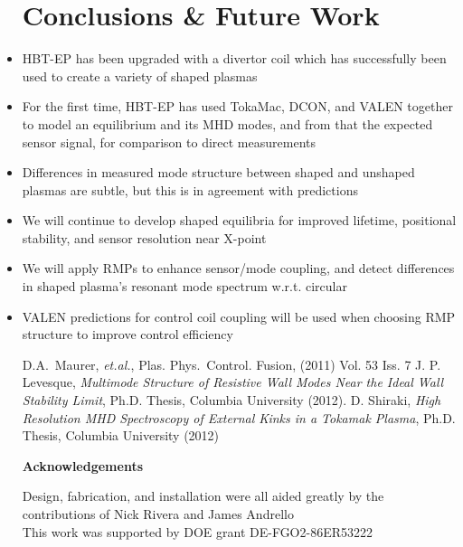 \documentclass{article}
\begin{document}
\begin{multicols}{5}
\begin{itemize}
\section{Conclusions \& Future Work}
\item HBT-EP has been upgraded with a divertor coil which has successfully been used to create a variety of shaped plasmas
\item For the first time, HBT-EP has used TokaMac, DCON, and VALEN together to model an equilibrium and its MHD modes, and from that the expected sensor signal, for comparison to direct measurements
\item Differences in measured mode structure between shaped and unshaped plasmas are subtle, but this is in agreement with predictions
\item We will continue to develop shaped equilibria for improved lifetime, positional stability, and sensor resolution near X-point
\item We will apply RMPs to enhance sensor/mode coupling, and detect differences in shaped plasma's resonant mode spectrum w.r.t. circular
\item VALEN predictions for control coil coupling will be used when choosing RMP structure to improve control efficiency
\begin{thebibliography}{9}%
\large
{}D.\thinspace A.~Maurer, {\it et.\thinspace al.\/}, Plas. Phys.~Control. Fusion,
(2011) Vol. 53 Iss. 7
 J. P. Levesque, \emph{Multimode Structure of Resistive Wall Modes Near the Ideal Wall Stability Limit}, Ph.D. Thesis, Columbia University (2012).
 D. Shiraki, \emph{High Resolution MHD Spectroscopy of External Kinks in a Tokamak Plasma}, Ph.D. Thesis, Columbia University (2012)
\end{thebibliography}
                                                                   
       
{\flushleft\LARGE\color{lnavy}\sf\bfseries{Acknowledgements}}

Design, fabrication, and installation were all aided greatly by the contributions of Nick Rivera and James Andrello\\
\newline
This work was supported by DOE grant DE-FGO2-86ER53222
\end{itemize}
\end{multicols}
\end{document}
